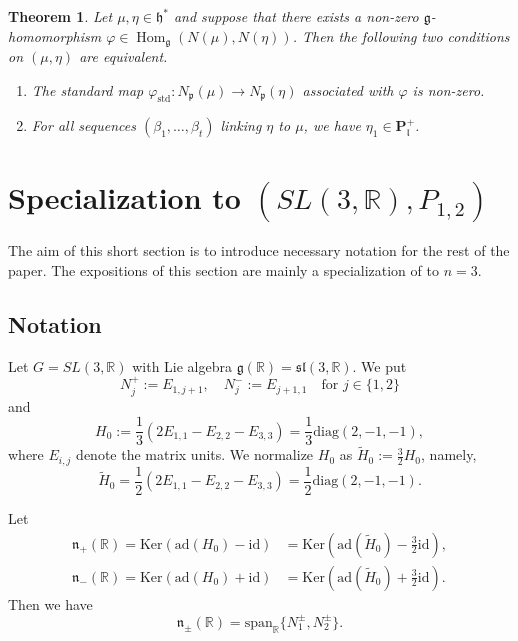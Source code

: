 \documentclass[reqno,11pt]{amsart}
\newtheorem{thm}[equation]{Theorem}
\theoremstyle{remark}
\numberwithin{equation}{section}
\newcommand{\fg}{{\mathfrak g}}
\newcommand{\fh}{{\mathfrak h}}
\newcommand{\fl}{{\mathfrak l}}
\newcommand{\fn}{{\mathfrak n}}
\newcommand{\fp}{{\mathfrak p}}
\newcommand{\f}{\mathfrak}
\newcommand{\R}{\mathbb{R}}
\newcommand{\ad}{\mathrm{ad}}
\newcommand{\Hom}{\operatorname{Hom}}
\newcommand{\spn}{\text{span}}
\newcommand{\wH}{\widetilde{H}}
\newcommand{\diag}{\mathrm{diag}}
\newcommand{\id}{\mathrm{id}}
\newcommand{\std}{\mathrm{std}}
\newcommand{\Ker}{\mathrm{Ker}}
\begin{document}
\begin{thm}\label{thm:Boe}
Let $\mu, \eta \in \fh^*$ and suppose that there exists a non-zero 
$\fg$-homomorphism
$\varphi \in \Hom_{\fg}(N(\mu), N(\eta))$.
Then the following two conditions on $(\mu,\eta)$ are equivalent.
\begin{enumerate}
\item[\emph{(i)}]
The standard map $\varphi_{\std}\colon N_\fp(\mu) \to N_\fp(\eta)$ 
associated with $\varphi$ is non-zero.
\item[\emph{(ii)}]
For all sequences 
$(\beta_1, \ldots, \beta_t)$ linking $\eta$ to $\mu$,
we have $\eta_1 \in \mathbf{P}^+_\fl$.
\end{enumerate}
\end{thm}

\section{Specialization to $(SL(3,\R), P_{1,2})$}
\label{sec:SL3}

The aim of this short section is to introduce necessary notation for the rest of the 
paper. The expositions of this section are mainly a specialization of
\cite{KuOr25a} to $n=3$.

\subsection{Notation}\label{sec:notation}
Let $G = SL(3,\R)$ with Lie algebra $\fg(\R)=\f{sl}(3,\R)$.
We put
\begin{equation}\label{eqn:Npm}
N_j^+:=E_{1,j+1},
\quad
N_j^-:=E_{j+1,1}
\quad
\text{for $j\in \{1, 2\}$}
\end{equation}
and 
\begin{equation*}
H_0:=\frac{1}{3}(2E_{1,1} - E_{2,2}- E_{3,3})
=\frac{1}{3}\diag(2, -1, -1),
\end{equation*}
where $E_{i,j}$ denote the matrix units. We normalize $H_0$ as
$\wH_0:=\frac{3}{2}H_0$,
namely,
\begin{equation}\label{eqn:H0}
\wH_0=\frac{1}{2}(2E_{1,1} -E_{2,2}-E_{3,3})
=\frac{1}{2}\diag(2, -1, -1).
\end{equation}

Let
\begin{align}
\fn_+(\R) =\Ker(\ad(H_0)-\id) 
&= \Ker(\ad(\wH_0)-\tfrac{3}{2}\id),\label{eqn:nR1}\\[3pt]
\fn_-(\R)=\Ker(\ad(H_0)+\id) 
&=\Ker(\ad(\wH_0)+\tfrac{3}{2}\id).\label{eqn:nR}
\end{align}
Then we have
\begin{equation*}
\fn_{\pm}(\R)=\spn_{\R}\{N_1^{\pm}, N_{2}^{\pm} \}.
\end{equation*}
\end{document}
